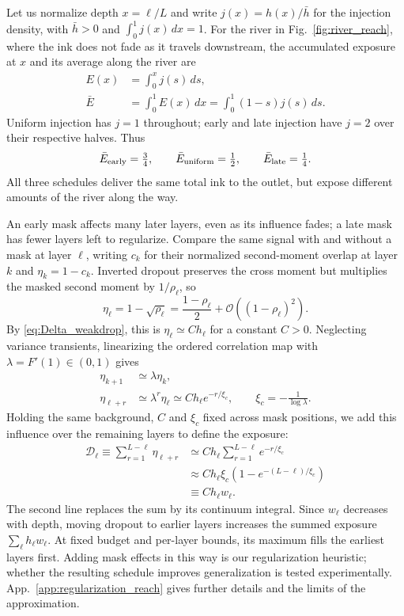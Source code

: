Let us normalize depth $x=\ell/L$ and write $j(x)=h(x)/\bar h$ for the injection density, with $\bar h>0$ and $\int_0^1j(x)\,dx=1$. For the river in Fig.~\ref{fig:river_reach}, where the ink does not fade as it travels downstream, the accumulated exposure at $x$ and its average along the river are
\begin{align}
E(x)&=\int_0^x j(s)\,ds,\\
\bar E&=\int_0^1 E(x)\,dx
       =\int_0^1(1-s)j(s)\,ds.
\end{align}
Uniform injection has $j=1$ throughout; early and late injection have $j=2$ over their respective halves. Thus
\begin{equation}
\bar E_{\rm early}=\tfrac34,\qquad
\bar E_{\rm uniform}=\tfrac12,\qquad
\bar E_{\rm late}=\tfrac14.
\end{equation}
All three schedules deliver the same total ink to the outlet, but expose different amounts of the river along the way.

An early mask affects many later layers, even as its influence fades; a late mask has fewer layers left to regularize. Compare the same signal with and without a mask at layer $\ell$, writing $c_k$ for their normalized second-moment overlap at layer $k$ and $\eta_k=1-c_k$. Inverted dropout preserves the cross moment but multiplies the masked second moment by $1/\rho_\ell$, so
\begin{equation}
\eta_\ell=1-\sqrt{\rho_\ell}
=\frac{1-\rho_\ell}{2}+\mathcal O((1-\rho_\ell)^2).
\end{equation}
By \eqref{eq:Delta_weakdrop}, this is $\eta_\ell\simeq C h_\ell$ for a constant $C>0$. Neglecting variance transients, linearizing the ordered correlation map with $\lambda=F'(1)\in(0,1)$ gives
\begin{align}
\eta_{k+1}&\simeq\lambda\eta_k,\\
\eta_{\ell+r}&\simeq\lambda^r\eta_\ell
\simeq C h_\ell e^{-r/\xi_c},\qquad
\xi_c=-\frac{1}{\log\lambda}.
\end{align}
Holding the same background, $C$ and $\xi_c$ fixed across mask positions, we add this influence over the remaining layers to define the exposure:
\begin{align}
\mathcal D_\ell\equiv\sum_{r=1}^{L-\ell}\eta_{\ell+r}
&\simeq C h_\ell\sum_{r=1}^{L-\ell}e^{-r/\xi_c}\nonumber\\
&\approx C h_\ell\xi_c\left(1-e^{-(L-\ell)/\xi_c}\right)\nonumber\\
&\equiv C h_\ell w_\ell.
\label{eq:regularization_reach}
\end{align}
The second line replaces the sum by its continuum integral. Since $w_\ell$ decreases with depth, moving dropout to earlier layers increases the summed exposure $\sum_\ell h_\ell w_\ell$. At fixed budget and per-layer bounds, its maximum fills the earliest layers first. Adding mask effects in this way is our regularization heuristic; whether the resulting schedule improves generalization is tested experimentally. App.~\ref{app:regularization_reach} gives further details and the limits of the approximation.
